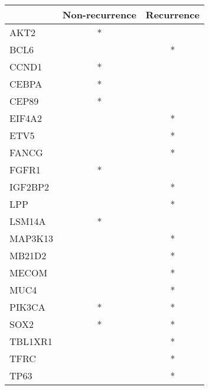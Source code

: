 \begin{tabular}{lcc}
\toprule
{} & Non-recurrence & Recurrence \\
\midrule
AKT2    &              * &            \\
BCL6    &                &          * \\
CCND1   &              * &            \\
CEBPA   &              * &            \\
CEP89   &              * &            \\
EIF4A2  &                &          * \\
ETV5    &                &          * \\
FANCG   &                &          * \\
FGFR1   &              * &            \\
IGF2BP2 &                &          * \\
LPP     &                &          * \\
LSM14A  &              * &            \\
MAP3K13 &                &          * \\
MB21D2  &                &          * \\
MECOM   &                &          * \\
MUC4    &                &          * \\
PIK3CA  &              * &          * \\
SOX2    &              * &          * \\
TBL1XR1 &                &          * \\
TFRC    &                &          * \\
TP63    &                &          * \\
\bottomrule
\end{tabular}
